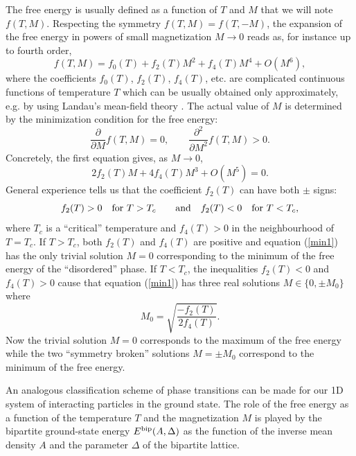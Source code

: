 \documentclass[12pt]{iopart}
\theoremstyle{definition}
\begin{document}
The free energy is usually defined as a function of $T$ and $M$ that we will note $f(T,M)$.
Respecting the symmetry $f(T,M)=f(T,-M)$, the expansion of the free energy
in powers of small magnetization $M\to 0$ reads as, for instance
up to fourth order,
\begin{equation} \label{Landau1}
f(T,M) = f_0(T) + f_2(T) M^2 + f_4(T) M^4 + O(M^6) ,
\end{equation}
where the coefficients $f_0(T)$, $f_2(T)$, $f_4(T)$, etc. are complicated
continuous functions of temperature $T$ which can be usually obtained only
approximately, e.g. by using Landau's mean-field theory
\cite{Bausch72,Landau37}.
The actual value of $M$ is determined by the minimization condition
for the free energy:
\begin{equation} \label{Landaumin1}
\frac{\partial}{\partial M} f(T,M) = 0 , \qquad
\frac{\partial^2}{\partial M^2} f(T,M) > 0 .
\end{equation}
Concretely, the first equation gives, as $M\to 0$,
\begin{equation} \label{min1}
2 f_2(T) M + 4 f_4(T) M^3 + O(M^5) = 0 .
\end{equation}
General experience tells us that the coefficient
$f_2(T)$ can have both $\pm$ signs:  
\begin{equation}
f_2(T) > 0 \quad \mbox{for $T>T_c$} \qquad {\rm and}
\quad f_2(T) < 0 \quad \mbox{for $T<T_c$} ,
\end{equation}
where $T_c$ is a ``critical'' temperature and $f_4(T)>0$ in the neighbourhood
of $T=T_c$.
If $T>T_c$, both $f_2(T)$ and $f_4(T)$ are positive and equation (\ref{min1})
has the only trivial solution $M=0$ corresponding to the minimum of
the free energy of the ``disordered'' phase.
If $T<T_c$, the inequalities $f_2(T)<0$ and $f_4(T)>0$ cause that
equation (\ref{min1}) has three real solutions $M\in \{0,\pm M_0\}$ where
\begin{equation}
M_0 = \sqrt{\frac{-f_2(T)}{2 f_4(T)}} .
\end{equation}  
Now the trivial solution $M=0$ corresponds to the maximum of the free energy
while the two ``symmetry broken'' solutions $M=\pm M_0$ correspond
to the minimum of the free energy.

An analogous classification scheme of phase transitions can be made for
our 1D system of interacting particles in the ground state.
The role of the free energy as a function of the temperature $T$ and
the magnetization $M$ is played by the bipartite ground-state energy
$E^{\rm bip}(A,\Delta)$ as the function of the inverse mean density $A$ and
the parameter $\Delta$ of the bipartite lattice.
\end{document}
